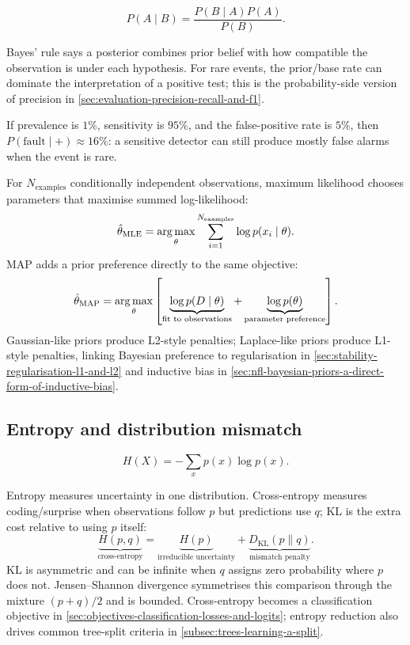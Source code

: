 \begin{calloutmemorise}
\[
\boxed{P(A\mid B)=\frac{P(B\mid A)P(A)}{P(B)}}.
\]
\end{calloutmemorise}
Bayes' rule says a posterior combines prior belief with how compatible the observation is under each hypothesis.
For rare events, the prior/base rate can dominate the interpretation of a positive test; this is the probability-side version of precision in \cref{sec:evaluation-precision-recall-and-f1}.

\begin{calloutexample}
If prevalence is $1\%$, sensitivity is $95\%$, and the false-positive rate is $5\%$, then $P(\text{fault}\mid +)\approx16\%$: a sensitive detector can still produce mostly false alarms when the event is rare.
\end{calloutexample}

\label{sec:foundations-maximum-likelihood-and-maximum-a-posteriori-estimation}
For $N_{\text{examples}}$ conditionally independent observations, maximum likelihood chooses parameters that maximise summed log-likelihood:
\[
\hat\theta_{\mathrm{MLE}}
=
\operatorname*{arg\,max}_{\theta}\sum_{i=1}^{N_{\text{examples}}}\log p(x_i\mid\theta).
\]
MAP adds a prior preference directly to the same objective:
\[
\hat\theta_{\mathrm{MAP}}
=
\operatorname*{arg\,max}_{\theta}
\left[
\underbrace{\log p(D\mid\theta)}_{\text{fit to observations}}
+
\underbrace{\log p(\theta)}_{\text{parameter preference}}
\right].
\]
Gaussian-like priors produce L2-style penalties; Laplace-like priors produce L1-style penalties, linking Bayesian preference to regularisation in \cref{sec:stability-regularisation-l1-and-l2} and inductive bias in \cref{sec:nfl-bayesian-priors-a-direct-form-of-inductive-bias}.

\subsection{Entropy and distribution mismatch}
\label{sec:foundations-entropy}

\begin{calloutmemorise}
\[
\boxed{H(X)=-\sum_x p(x)\log p(x)}.
\]
\end{calloutmemorise}
Entropy measures uncertainty in one distribution.
Cross-entropy measures coding/surprise when observations follow $p$ but predictions use $q$; KL is the extra cost relative to using $p$ itself:
\label{sec:foundations-cross-entropy-kl-divergence-and-jensen-shannon-divergence}
\[
\underbrace{H(p,q)}_{\text{cross-entropy}}
=
\underbrace{H(p)}_{\text{irreducible uncertainty}}
+
\underbrace{D_{\mathrm{KL}}(p\|q)}_{\text{mismatch penalty}}.
\]
KL is asymmetric and can be infinite when $q$ assigns zero probability where $p$ does not.
Jensen--Shannon divergence symmetrises this comparison through the mixture $(p+q)/2$ and is bounded.
Cross-entropy becomes a classification objective in \cref{sec:objectives-classification-losses-and-logits}; entropy reduction also drives common tree-split criteria in \cref{subsec:trees-learning-a-split}.

